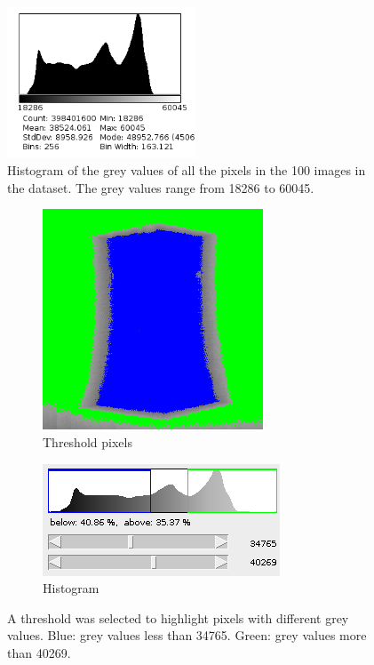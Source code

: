 \documentclass[12pt]{report}
\begin{document}
\begin{figure}
\centering
\includegraphics[width=0.5\textwidth]{figures/block_histogram.png}
\caption{Histogram of the grey values of all the pixels in the 100 images in the dataset. The grey values range from 18286 to 60045.}
\label{fig:block_histogram}
\end{figure}

\begin{figure}
	\centering
	\begin{subfigure}[b]{0.45\textwidth}
		\includegraphics[width=\textwidth]{figures/block_threshold.png}
		\caption{Threshold pixels}
	\end{subfigure}
	\begin{subfigure}[b]{0.45\textwidth}
		\includegraphics[]{figures/block_threshold_histogram.png}
		\caption{Histogram}	
	\end{subfigure}
	\caption{A threshold was selected to highlight pixels with different grey values. Blue: grey values less than 34765. Green: grey values more than 40269.}
	\label{fig:block_threshold}
\end{figure}
\end{document}
